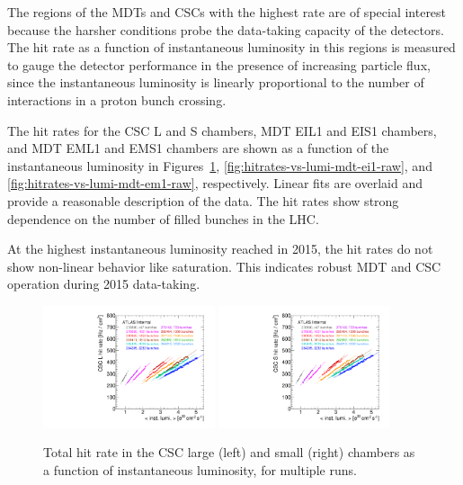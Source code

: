 The regions of the MDTs and CSCs with the highest rate are of special interest because the harsher conditions probe the data-taking capacity of the detectors. The hit rate as a function of instantaneous luminosity in this regions is measured to gauge the detector performance in the presence of increasing particle flux, since the instantaneous luminosity is linearly proportional to the number of interactions in a proton bunch crossing.

The hit rates for the CSC L and S chambers, MDT EIL1 and EIS1 chambers, and MDT EML1 and EMS1 chambers are shown as a function of the instantaneous luminosity in Figures~\ref{fig:hitrates-vs-lumi-csc-raw}, \ref{fig:hitrates-vs-lumi-mdt-ei1-raw}, and \ref{fig:hitrates-vs-lumi-mdt-em1-raw}, respectively. Linear fits are overlaid and provide a reasonable description of the data. The hit rates show strong dependence on the number of filled bunches in the LHC.

At the highest instantaneous luminosity reached in 2015, the hit rates do not show non-linear behavior like saturation. This indicates robust MDT and CSC operation during 2015 data-taking.

\begin{figure}
  \begin{center}
    \includegraphics[width=0.45\textwidth]{./figures/rate_raw_vs_lumi_vs_evts_csc_CSL1_overlay.pdf}
    \includegraphics[width=0.45\textwidth]{./figures/rate_raw_vs_lumi_vs_evts_csc_CSS1_overlay.pdf}
    \caption{Total hit rate in the CSC large (left) and small (right) chambers as a function of instantaneous luminosity, for multiple runs.}
    \label{fig:hitrates-vs-lumi-csc-raw}
  \end{center}
\end{figure}

